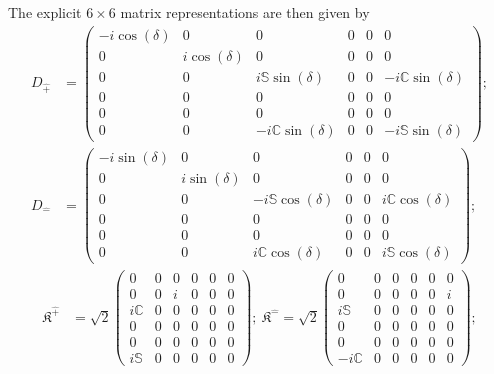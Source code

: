 \documentclass[foundations,article,submit,pdftex,moreauthors]{Definitions/mdpi}
\begin{document}
The explicit $6\times6$ matrix representations are then given by
\begin{align}
    D_{\hat{+}}&=\begin{pmatrix}
        -i\cos{(\delta)}&0&0&0&0&0\\
        0&i\cos{(\delta)}&0&0&0&0\\
        0&0&i\mathbb{S}\sin{(\delta)}&0&0&-i\mathbb{C}\sin{(\delta)}\\
        0&0&0&0&0&0\\
        0&0&0&0&0&0\\
        0&0&-i\mathbb{C}\sin{(\delta)}&0&0&-i\mathbb{S}\sin{(\delta)}
    \end{pmatrix};\nonumber\\
    D_{\hat{-}}&=\begin{pmatrix}
        -i\sin{(\delta)}&0&0&0&0&0\\
        0&i\sin{(\delta)}&0&0&0&0\\
        0&0&-i\mathbb{S}\cos{(\delta)}&0&0&i\mathbb{C}\cos{(\delta)}\\
        0&0&0&0&0&0\\
        0&0&0&0&0&0\\
        0&0&i\mathbb{C}\cos{(\delta)}&0&0&i\mathbb{S}\cos{(\delta)}
    \end{pmatrix};\nonumber
\end{align}
\begin{align}
    \mathfrak{K}^{\hat{+}}&=\sqrt{2}\begin{pmatrix}
        0&0&0&0&0&0\\
        0&0&i&0&0&0\\
        i\mathbb{C}&0&0&0&0&0\\
        0&0&0&0&0&0\\
        0&0&0&0&0&0\\
        i\mathbb{S}&0&0&0&0&0
    \end{pmatrix};
    ~\mathfrak{K}^{\hat{-}}=\sqrt{2}\begin{pmatrix}
        0&0&0&0&0&0\\
        0&0&0&0&0&i\\
        i\mathbb{S}&0&0&0&0&0\\
        0&0&0&0&0&0\\
        0&0&0&0&0&0\\
        -i\mathbb{C}&0&0&0&0&0
    \end{pmatrix};\nonumber
    \end{align}
\end{document}
